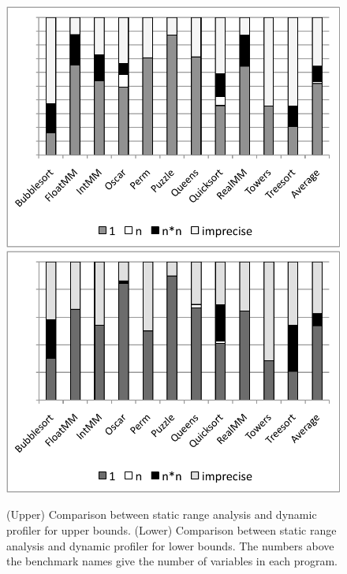 \documentclass[preprint]{sigplanconf}[10pt]
\begin{document}
\begin{figure}[t!]
\begin{center}
\includegraphics[width=\columnwidth]{images/precUpperBound}
\includegraphics[width=\columnwidth]{images/precLowerBound}
\end{center}
\caption{\label{fig:precision}
(Upper) Comparison between static range analysis and dynamic profiler for
upper bounds.
(Lower) Comparison between static range analysis and dynamic profiler for
lower bounds. The numbers above the benchmark names give the number of
variables in each program.}
\end{figure}
\end{document}
